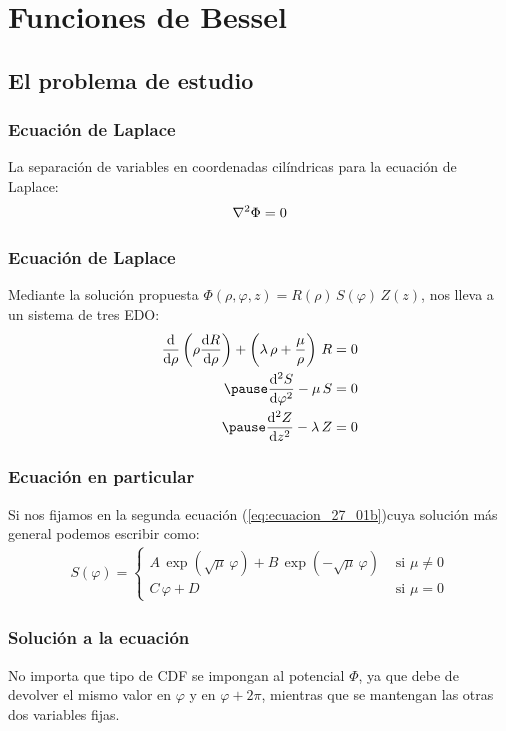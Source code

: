 \documentclass[12pt]{beamer}
\begin{document}
\section{Funciones de Bessel}
\subsection{El problema de estudio}

\begin{frame}
\frametitle{Ecuación de Laplace}
La separación de variables en coordenadas cilíndricas para la ecuación de Laplace:
\pause
\begin{align*}
\laplacian{\Phi} = 0
\end{align*}
\end{frame}
\begin{frame}
\frametitle{Ecuación de Laplace}    
Mediante la solución propuesta $\Phi (\rho, \varphi, z) = R(\rho) \, S(\varphi) \, Z(z)$, \pause nos lleva a un sistema de tres EDO: \pause
\begin{eqnarray}
\dv{\rho} \left( \rho \dv{R}{\rho} \right) + \left( \lambda \, \rho + \dfrac{\mu}{\rho} \right) \, R &= 0 \label{eq:ecuacion_27_01a} \\ \pause
\dv[2]{S}{\varphi} - \mu \, S &= 0 \label{eq:ecuacion_27_01b}\\ \pause
\dv[2]{Z}{z} - \lambda \, Z &= 0 \label{eq:ecuacion_27_01c}
\end{eqnarray}
\end{frame}
\begin{frame}
\frametitle{Ecuación en particular}
Si nos fijamos en la segunda ecuación (\ref{eq:ecuacion_27_01b})cuya solución más general podemos escribir como:
\pause
\begin{align}
S (\varphi) = \begin{cases}
A \, \exp(\sqrt{\mu} \, \varphi) + B \, \exp(-\sqrt{\mu} \, \varphi) & \mbox{ si } \mu \neq 0 \\
C \,\varphi + D & \mbox { si } \mu = 0
\end{cases}
\label{eq:ecuacion_27_02}
\end{align}
\end{frame}
\begin{frame}
\frametitle{Solución a la ecuación}
No importa que tipo de CDF se impongan al potencial $\Phi$, \pause ya que debe de devolver el mismo valor en $\varphi$ y en $\varphi + 2 \pi$, mientras que se mantengan las otras dos variables fijas.
\end{frame}
\end{document}
